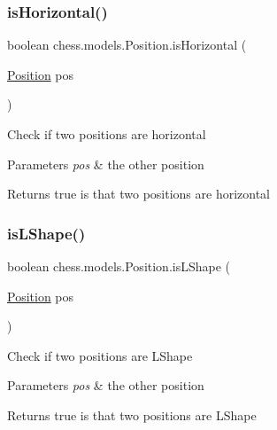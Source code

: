 \subsubsection{\texorpdfstring{is\+Horizontal()}{isHorizontal()}}
{\footnotesize\ttfamily boolean chess.\+models.\+Position.\+is\+Horizontal (\begin{DoxyParamCaption}\item[{\mbox{\hyperlink{classchess_1_1models_1_1_position}{Position}}}]{pos }\end{DoxyParamCaption})}

Check if two positions are horizontal


\begin{DoxyParams}{Parameters}
{\em pos} & the other position \\
\hline
\end{DoxyParams}
\begin{DoxyReturn}{Returns}
true is that two positions are horizontal 
\end{DoxyReturn}
\mbox{\label{classchess_1_1models_1_1_position_a7e79c1169c4333aa98d6445af82ea5e2}} 
\subsubsection{\texorpdfstring{is\+L\+Shape()}{isLShape()}}
{\footnotesize\ttfamily boolean chess.\+models.\+Position.\+is\+L\+Shape (\begin{DoxyParamCaption}\item[{\mbox{\hyperlink{classchess_1_1models_1_1_position}{Position}}}]{pos }\end{DoxyParamCaption})}

Check if two positions are L\+Shape


\begin{DoxyParams}{Parameters}
{\em pos} & the other position \\
\hline
\end{DoxyParams}
\begin{DoxyReturn}{Returns}
true is that two positions are L\+Shape 
\end{DoxyReturn}
\mbox{\label{classchess_1_1models_1_1_position_a50da6933e82356a80b6f012251189d25}} 
